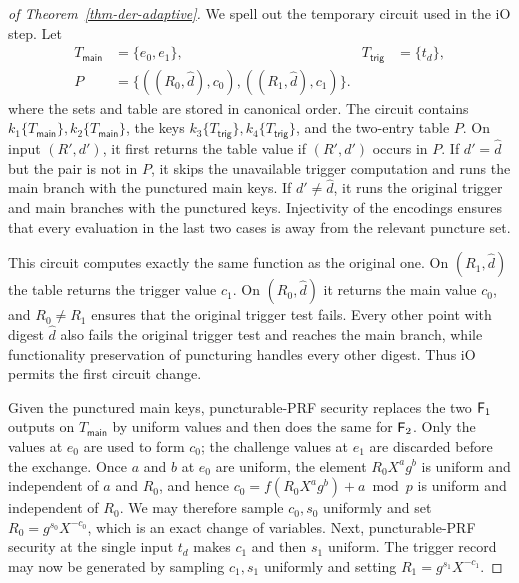 \begin{proof}[of Theorem~\ref{thm-der-adaptive}]
We spell out the temporary circuit used in the iO step. Let
$$
\begin{aligned}
T_{\mathsf{main}}&=\{e_0,e_1\},
&T_{\mathsf{trig}}&=\{t_d\},\\
P&=\{((R_0,\widehat d),c_0),((R_1,\widehat d),c_1)\}.
\end{aligned}
$$
where the sets and table are stored in canonical order. The circuit contains $k_1\{T_{\mathsf{main}}\},k_2\{T_{\mathsf{main}}\}$, the keys $k_3\{T_{\mathsf{trig}}\},k_4\{T_{\mathsf{trig}}\}$, and the two-entry table $P$. On input $(R',d')$, it first returns the table value if $(R',d')$ occurs in $P$. If $d'=\widehat d$ but the pair is not in $P$, it skips the unavailable trigger computation and runs the main branch with the punctured main keys. If $d'\ne\widehat d$, it runs the original trigger and main branches with the punctured keys. Injectivity of the encodings ensures that every evaluation in the last two cases is away from the relevant puncture set.

This circuit computes exactly the same function as the original one. On $(R_1,\widehat d)$ the table returns the trigger value $c_1$. On $(R_0,\widehat d)$ it returns the main value $c_0$, and $R_0\ne R_1$ ensures that the original trigger test fails. Every other point with digest $\widehat d$ also fails the original trigger test and reaches the main branch, while functionality preservation of puncturing handles every other digest. Thus iO permits the first circuit change.

Given the punctured main keys, puncturable-PRF security replaces the two $\mathsf{F}_1$ outputs on $T_{\mathsf{main}}$ by uniform values and then does the same for $\mathsf{F}_2$. Only the values at $e_0$ are used to form $c_0$; the challenge values at $e_1$ are discarded before the exchange. Once $a$ and $b$ at $e_0$ are uniform, the element $R_0X^ag^b$ is uniform and independent of $a$ and $R_0$, and hence $c_0=f(R_0X^ag^b)+a\bmod p$ is uniform and independent of $R_0$. We may therefore sample $c_0,s_0$ uniformly and set $R_0=g^{s_0}X^{-c_0}$, which is an exact change of variables. Next, puncturable-PRF security at the single input $t_d$ makes $c_1$ and then $s_1$ uniform. The trigger record may now be generated by sampling $c_1,s_1$ uniformly and setting $R_1=g^{s_1}X^{-c_1}$.


\end{proof}
